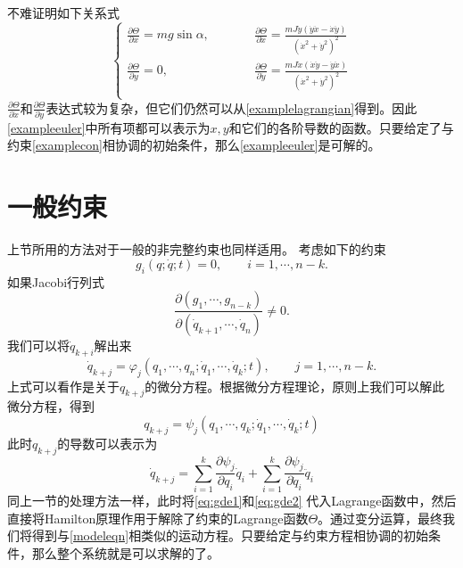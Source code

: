 \documentclass[a4paper,UTF8,11pt,hyperref]{ctexart}
\begin{document}
不难证明如下关系式
\begin{equation}
\left\{\begin{array}{ccc}
   \frac{\partial \Theta}{\partial x}= m g \sin\alpha,&\hspace{2em}&\frac{\partial \Theta}{\partial \ddot{x}}=\frac{m J \dot{y}(\dot{y}\ddot{x}-\dot{x}\ddot{y})}{(\dot{x}^2+\dot{y}^2)^2}\\[6pt]
   \frac{\partial \Theta}{\partial y}= 0 ,&\hspace{2em}& \frac{\partial \Theta}{\partial \ddot{y}}=\frac{m J \dot{x}(\dot{x}\ddot{y}-\dot{y}\ddot{x})}{(\dot{x}^2+\dot{y}^2)^2}\\
  \end{array}\right.
\end{equation}
$\frac{\partial \Theta}{\partial \dot{x}}$和$\frac{\partial \Theta}{\partial \dot{y}}$表达式较为复杂，但它们仍然可以从\eqref{examplelagrangian}得到。因此\eqref{exampleeuler}中所有项都可以表示为$x, y$和它们的各阶导数的函数。只要给定了与约束\eqref{examplecon}相协调的初始条件，那么\eqref{exampleeuler}是可解的。
\section{一般约束}
上节所用的方法对于一般的非完整约束也同样适用。
考虑如下的约束
\begin{equation}
g_i(q;\dot{q};t)=0,\hspace{2em}i=1,\cdots,n-k.
\end{equation}
如果Jacobi行列式
\[
\frac{\partial (g_1,\cdots,g_{n-k})}{\partial (\dot{q}_{k+1},\cdots,\dot{q}_n)}\neq0.
\]
我们可以将$\dot{q}_{k+i}$解出来
\begin{equation}\label{eq:gde}
\dot{q}_{k+j}=\varphi_j(q_1,\cdots,q_n;\dot{q}_1,\cdots,\dot{q}_k;t),\hspace{2em}j=1,\cdots,n-k.
\end{equation}
上式可以看作是关于$q_{k+j}$的微分方程。根据微分方程理论，原则上我们可以解此微分方程，得到
\begin{equation}\label{eq:gde1}
q_{k+j}=\psi_j(q_1,\cdots,q_k;\dot{q}_1,\cdots,\dot{q}_k;t)
\end{equation}
此时$q_{k+j}$的导数可以表示为
\begin{equation}\label{eq:gde2}
\dot{q}_{k+j}=\sum_{i=1}^k{\frac{\partial \psi_j}{\partial q_i}}\dot{q}_i+\sum_{i=1}^k{\frac{\partial \psi_j}{\partial \dot{q}_i} \ddot{q}_i}
\end{equation}
同上一节的处理方法一样，此时将\eqref{eq:gde1}和\eqref{eq:gde2} 代入Lagrange函数中，然后直接将Hamilton原理作用于解除了约束的Lagrange函数$\Theta$。通过变分运算，最终我们将得到与\eqref{modeleqn}相类似的运动方程。只要给定与约束方程相协调的初始条件，那么整个系统就是可以求解的了。
\end{document}
